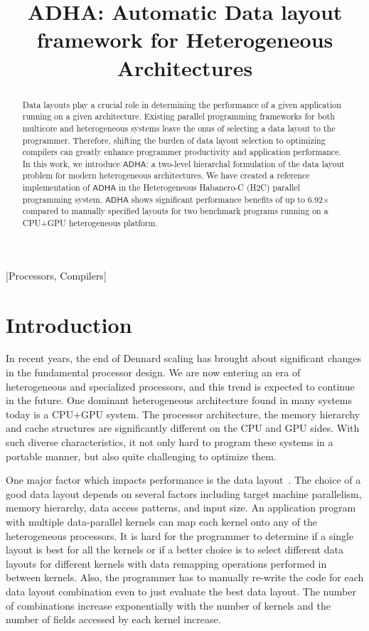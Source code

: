 \documentclass{sig-alternate-2013}
\newcommand{\ADHA}{\ensuremath{\mathsf{ADHA}}}
\begin{document}
\title{ADHA: Automatic Data layout framework for Heterogeneous Architectures}
\maketitle
\begin{abstract}
Data layouts play a crucial role in determining the performance
of a given
application running on a given architecture. 
Existing parallel programming frameworks for both multicore and heterogeneous
systems leave the onus of selecting a data layout to the programmer. Therefore, shifting the burden of data layout selection to optimizing compilers can greatly enhance programmer productivity and application performance. 
In this work, we introduce {\ADHA}: a two-level
hierarchal formulation of the data layout problem for modern heterogeneous
architectures. 
We have created a reference implementation of {\ADHA} in the 
Heterogeneous Habanero-C (H2C) parallel programming system. {\ADHA}
shows significant performance benefits of up to 6.92$\times$ compared to  manually specified layouts for two
benchmark programs running on a CPU+GPU heterogeneous platform.
\end{abstract}
\vspace*{-3pt}
[Processors, Compilers]
\vspace*{-3pt}
\section{Introduction}
In recent years, the end of Dennard scaling has brought about significant changes in the fundamental processor design. We are now entering an era of heterogeneous and specialized processors, and this trend is expected to continue in the future. One dominant heterogeneous architecture found in many systems today is a CPU+GPU system. The processor architecture, the memory hierarchy and cache structures are significantly different on the CPU and GPU sides. With such diverse characteristics, it not only hard to program these systems in a portable manner, but also quite challenging to optimize them.

One major factor which impacts performance is the data layout~\cite{dmajeti,sung}. The choice of a good data layout depends on several factors including target machine parallelism, memory hierarchy, data access patterns, and input size. An application program with multiple data-parallel kernels can map each kernel onto any of the heterogeneous processors. It is hard for the programmer to determine if a single layout is best for all the kernels or if a better choice is to select different data layouts for different kernels with data remapping operations performed in between kernels. Also, the programmer has to manually re-write the code for each data layout combination even to just evaluate the best data layout. The number of combinations increase exponentially with the number of kernels and the number of fields accessed by each kernel increase.
\end{document}
